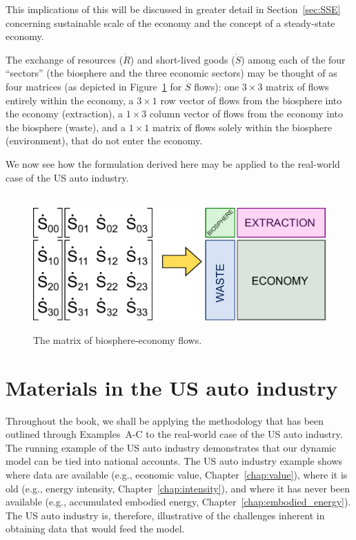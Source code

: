\noindent{}This implications of this 
will be discussed in greater detail
in Section~\ref{sec:SSE} concerning 
sustainable scale of the economy and
the concept of a steady-state economy.

The exchange of resources ($\dot{R}$) and 
short-lived goods ($\dot{S}$) among
each of the four ``sectors''
(the biosphere and 
the three economic sectors) 
may be thought of as four matrices 
(as depicted in Figure~\ref{fig:C_mat_matrix} 
for $\dot{S}$ flows): 
one $3\times3$ matrix of flows 
entirely within the economy, 
a $3\times1$ row vector of flows from the 
biosphere into the economy (extraction), 
a $1\times3$ column vector of flows from the economy 
into the biosphere (waste), 
and a $1\times1$ matrix of flows 
solely within the biosphere (environment), 
that do not enter the economy.

We now see how the formulation derived here may be
applied to the real-world case of the US auto industry.

\begin{figure}[!ht]
\centering\
\includegraphics[width=0.8\linewidth]{Part_1/Chapter_Materials/images/Matrix.pdf}
\caption[The matrix of biosphere-economy flows]{The matrix of biosphere-economy flows.}
\label{fig:C_mat_matrix}
\end{figure}

\section{Materials in the US auto industry}
\label{sec:materials_auto}

Throughout the book, we shall be applying the methodology
that has been outlined through Examples~A-C to the
real-world case of the US auto industry.
The running example of the US auto industry demonstrates that our dynamic model 
can be tied into national accounts.
The US auto industry example shows where data are available 
(e.g., economic value, Chapter~\ref{chap:value}), 
where it is old (e.g., energy intensity, Chapter~\ref{chap:intensity}), 
and where it has never been available 
(e.g., accumulated embodied energy, Chapter~\ref{chap:embodied_energy}).  
The US auto industry is, therefore, 
illustrative of the challenges inherent 
in obtaining data that would feed the model.

